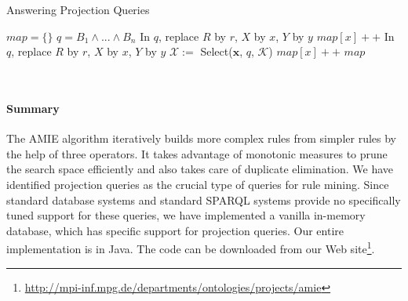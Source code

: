 \begin{algorithm}
\caption{Answering Projection Queries}
\label{algi}
\begin{algorithmic}[1]
    \State $map = \{\}$
    \State $q=B_1 \wedge ... \wedge B_n$
	    \State In $q$, replace $R$ by $r$, $X$ by $x$, $Y$ by $y$
		\State $map[x]++$
	    \EndIf
	  \EndFor
	\Else
	    \State In $q$, replace $R$ by $r$, $X$ by $x$, $Y$ by $y$
	    \State $\mathcal{X} :=$ Select($\bm{x}$, $q$, $\mathcal{K}$)
		  \State $map[x]++$
	    \EndFor
	  \EndFor
	\EndIf
	\State \Return $map$
\EndFunction
\end{algorithmic}
\end{algorithm}
\ \\[-1cm]


\paragraph{Summary}
The AMIE algorithm iteratively builds more complex rules from simpler rules by the help of three operators.
It takes advantage of monotonic measures to prune the search space efficiently and also takes care of duplicate elimination.
We have identified projection queries as the crucial type of queries for rule mining.
Since standard database systems and standard SPARQL systems provide no specifically tuned support for these queries,
we have implemented a vanilla in-memory database, which has specific support for projection queries.
Our entire implementation is in Java. The code can be downloaded from our Web site\footnote{\url{http://mpi-inf.mpg.de/departments/ontologies/projects/amie}}.

